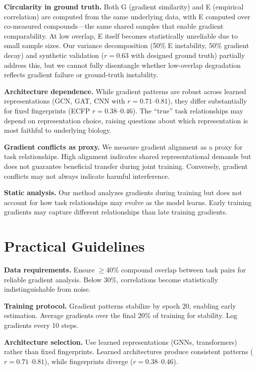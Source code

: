 \documentclass[sigconf,nonacm]{acmart}
\begin{document}
\textbf{Circularity in ground truth.} Both G (gradient similarity) and E (empirical correlation) are computed from the same underlying data, with E computed over co-measured compounds---the same shared samples that enable gradient comparability. At low overlap, E itself becomes statistically unreliable due to small sample sizes. Our variance decomposition (50\% E instability, 50\% gradient decay) and synthetic validation ($r=0.63$ with designed ground truth) partially address this, but we cannot fully disentangle whether low-overlap degradation reflects gradient failure or ground-truth instability.

\textbf{Architecture dependence.} While gradient patterns are robust across learned representations (GCN, GAT, CNN with $r = 0.71$--$0.81$), they differ substantially for fixed fingerprints (ECFP $r = 0.38$--$0.46$). The ``true'' task relationships may depend on representation choice, raising questions about which representation is most faithful to underlying biology.

\textbf{Gradient conflicts as proxy.} We measure gradient alignment as a proxy for task relationships. High alignment indicates shared representational demands but does not guarantee beneficial transfer during joint training. Conversely, gradient conflicts may not always indicate harmful interference.

\textbf{Static analysis.} Our method analyzes gradients during training but does not account for how task relationships may evolve as the model learns. Early training gradients may capture different relationships than late training gradients.

\section{Practical Guidelines}
\label{app:guidelines}

\textbf{Data requirements.} Ensure $\geq$40\% compound overlap between task pairs for reliable gradient analysis. Below 30\%, correlations become statistically indistinguishable from noise.

\textbf{Training protocol.} Gradient patterns stabilize by epoch 20, enabling early estimation. Average gradients over the final 20\% of training for stability. Log gradients every 10 steps.

\textbf{Architecture selection.} Use learned representations (GNNs, transformers) rather than fixed fingerprints. Learned architectures produce consistent patterns ($r = 0.71$--$0.81$), while fingerprints diverge ($r = 0.38$--$0.46$).
\end{document}
